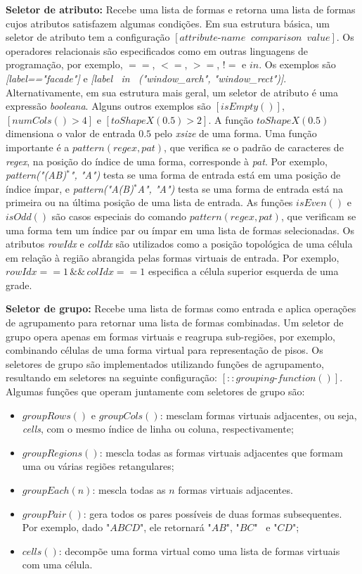 \textbf{Seletor de atributo:} Recebe uma lista de formas e retorna uma lista de formas cujos atributos satisfazem algumas condições. Em sua estrutura básica, um seletor de atributo tem a configuração $[attribute\mbox{-}name \;\; comparison \:\; value]$. Os operadores relacionais são especificados como em outras linguagens de programação, por exemplo, $==$, $<=$, $>=$, $!=$ e $in$. Os exemplos são \textit{[label=="facade"]} e \textit{[label \, in \, ("window\_arch", "window\_rect")]}. Alternativamente, em sua estrutura mais geral, um seletor de atributo é uma expressão \textit{booleana}. Alguns outros exemplos são $[isEmpty()]$, $[numCols()>4]$ e $[toShapeX(0.5)>2]$. A função $toShapeX(0.5)$ dimensiona o valor de entrada $0.5$ pelo \textit{xsize} de uma forma. Uma função importante é a $pattern(regex, pat)$, que verifica se o padrão de caracteres de \textit{regex}, na posição do índice de uma forma, corresponde à \textit{pat}. Por exemplo, \textit{pattern("(AB)$^*$", "A")} testa se uma forma de entrada está em uma posição de índice ímpar, e \textit{pattern("A(B)$^*$A", "A")} testa se uma forma de entrada está na primeira ou na última posição de uma lista de entrada. As funções $isEven()$ e $isOdd()$ são casos especiais do comando $pattern(regex, pat)$, que verificam se uma forma tem um índice par ou ímpar em uma lista de formas selecionadas. Os atributos \textit{rowIdx} e \textit{colIdx} são utilizados como a posição topológica de uma célula em relação à região abrangida pelas formas virtuais de entrada. Por exemplo, $rowIdx==1 \, \&\& \, colIdx==1$ especifica a célula superior esquerda de uma grade. 

\textbf{Seletor de grupo:} Recebe uma lista de formas como entrada e aplica operações de agrupamento para retornar uma lista de formas combinadas. Um seletor de grupo opera apenas em formas virtuais e reagrupa sub-regiões, por exemplo, combinando células de uma forma virtual para representação de pisos. Os seletores de grupo são implementados utilizando funções de agrupamento, resultando em seletores na seguinte configuração: $[::grouping\mbox{-}function()]$. Algumas funções que operam juntamente com seletores de grupo são:

\begin{itemize}
    \item $groupRows()$ e $groupCols()$: mesclam formas virtuais adjacentes, ou seja, \textit{cells}, com o mesmo índice de linha ou coluna, respectivamente;
    
    \item $groupRegions()$: mescla todas as formas virtuais adjacentes que formam uma ou várias regiões retangulares;
    
    \item $groupEach(n)$: mescla todas as $n$ formas virtuais adjacentes.
    
    \item $groupPair()$: gera todos os pares possíveis de duas formas subsequentes. Por exemplo, dado "$ABCD$", ele retornará "$AB$", "$BC$" \, e "$CD$";
    
    \item $cells()$: decompõe uma forma virtual como uma lista de formas virtuais com uma célula.
\end{itemize}

